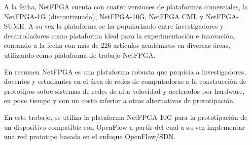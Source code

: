 A la fecha, NetFPGA cuenta con cuatro versiones de plataformas comerciales, la NetFPGA-1G  
 (discontinuada), NetFPGA-10G, NetFPGA CML y NetFPGA-SUME. A su vez la plataforma se ha popularizado entre investigadores y desarrolladores como plataforma ideal para la experimentación e innovación, contando a la fecha con m\'as de 226 artículos académicos \cite{NetFPGA4} en diversas áreas, utilizando como plataforma de trabajo NetFPGA.

En resumen NetFPGA es una plataforma robusta que propicia a investigadores, docentes y estudiantes en el área de redes de computadoras a la construcción de prototipos sobre sistemas de redes de alta velocidad y acelerados por hardware, en poco tiempo y con un costo inferior a otras alternativas de prototipaci\'on.

En este trabajo, se utiliza la plataforma NetFPGA-10G para la prototipaci\'on de un dispositivo compatible con OpenFlow a partir del cual a su vez implementar una red prototipo basada en el enfoque OpenFlow/SDN. 


